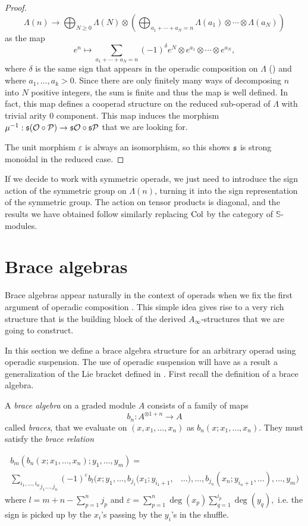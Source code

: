 \documentclass[Thesis.tex]{subfiles}
\begin{document}
\begin{proof}
\[\Lambda(n)\to \bigoplus_{N\geq 0} \Lambda(N)\otimes\left(\bigoplus_{a_1+\cdots+a_N=n}\Lambda(a_1)\otimes\cdots\otimes\Lambda(a_N)\right)\]
as the map
\[e^n\mapsto\sum_{a_1+\cdots+a_N=n}(-1)^{\delta}e^N\otimes  e^{a_1}\otimes\cdots\otimes e^{a_N},\]
where $\delta$ is the same sign that appears in the operadic composition on $\Lambda$ () and where $a_1,\dots,a_k>0$. Since there are only finitely many ways of decomposing $n$ into $N$ positive integers, the sum is finite and thus the map is well defined. In fact, this map defines a cooperad structure on the reduced sub-operad of $\Lambda$ with trivial arity 0 component. This map induces the morphism $\mu^{-1}:\mathfrak{s}({\mathcal O}\circ\mathcal{P})\to \mathfrak{s}{\mathcal O}\circ\mathfrak{s}\mathcal{P}$ that we are looking for.

The unit morphism $\varepsilon$ is always an isomorphism, so this shows $\mathfrak{s}$ is strong monoidal in the reduced case.
\end{proof}

\begin{remark}
If we decide to work with symmetric operads, we just need to introduce the sign action of the symmetric group on $\Lambda(n)$, turning it into the sign representation of the symmetric group. The action on tensor products is diagonal, and the results we have obtained follow similarly replacing $\mathrm{Col}$ by the category of $\mathbb{S}$-modules.
\end{remark}

\section{Brace algebras}\label{sectionbraces}
Brace algebras appear naturally in the context of operads when we fix the first argument of operadic composition \cite{GV}. This simple idea gives rise to a very rich structure that is the building block of the derived $A_\infty$-structures that we are going to construct.

In this section we define a brace algebra structure for an arbitrary operad using operadic suspension. The use of operadic suspension will have as a result  a generalization of the Lie bracket defined in \cite{RW}. First recall the definition of a brace algebra.

\begin{defin}\label{braces}
A \emph{brace algebra} on a graded module $A$ consists of a family of maps \[b_n:A^{\otimes 1+n}\to A\] called \emph{braces}, that we evaluate on $(x,x_1,\dots, x_n)$ as $b_n(x;x_1,\dots, x_n)$. They must satisfy the \emph{brace relation}


\begin{align*}
b_m(b_n(x;x_1,\dots, x_n);y_1,\dots,y_m)=&\\
\underset{j_1\dots, j_n}{\sum_{i_1,\dots, i_n}}(-1)^{\varepsilon}b_l(x; y_1,\dots,b_{j_1}(x_1;y_{i_1+1},&\dots),\dots, b_{j_n}(x_n;y_{i_n+1},\dots),\dots,y_m)
\end{align*}
where $l=m+n-\sum_{p=1}^n j_p$ and $\varepsilon=\sum_{p=1}^n\deg(x_p)\sum_{q=1}^{i_p}\deg(y_q),$ i.e. the sign is picked up by the $x_i$'s passing by the $y_i$'s in the shuffle.
\end{defin}
\end{document}
